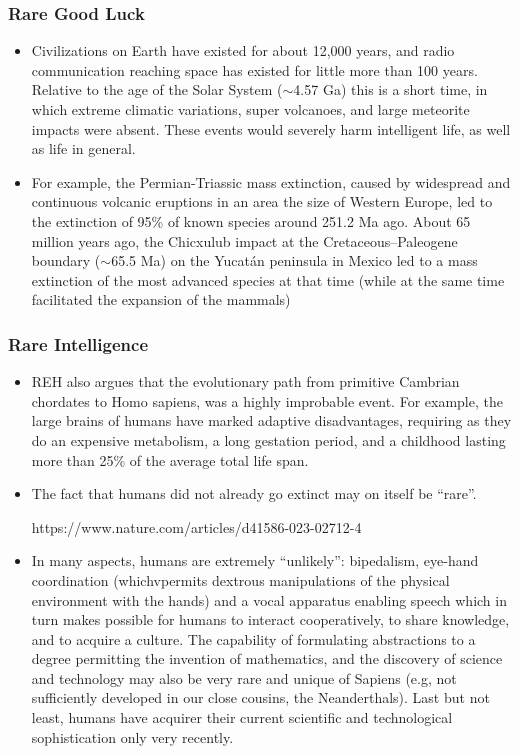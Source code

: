 \begin{frame}
\frametitle{Rare Good Luck}
\begin{itemize}
\item Civilizations on Earth have existed for about 12,000 years, and radio communication reaching space has existed for little more than 100 years. Relative to the age of the Solar System ($\sim$4.57 Ga) this is a short time, in which extreme climatic variations, super volcanoes, and large meteorite impacts were absent. These events would severely harm intelligent life, as well as life in general.
\item For example, the Permian-Triassic mass extinction, caused by widespread and continuous volcanic eruptions in an area the size of Western Europe, led to the extinction of 95\% of known species around 251.2 Ma ago. About 65 million years ago, the Chicxulub impact at the Cretaceous--Paleogene boundary ($\sim$65.5 Ma) on the Yucatán peninsula in Mexico led to a mass extinction of the most advanced species at that time (while at the same time facilitated the expansion of the mammals)
\end{itemize}
\end{frame}


\begin{frame}
\frametitle{Rare Intelligence}
\begin{itemize}
\item REH also argues that the evolutionary path from primitive Cambrian chordates to Homo sapiens, was a highly improbable event. For example, the large brains of humans have marked adaptive disadvantages, requiring as they do an expensive metabolism, a long gestation period, and a childhood lasting more than 25\% of the average total life span.
\item The fact that humans did not already go extinct may on itself be ``rare''.

https://www.nature.com/articles/d41586-023-02712-4

\item In many aspects, humans are extremely ``unlikely'': bipedalism, eye-hand coordination
(whichvpermits dextrous manipulations of the physical environment with the hands) and a vocal apparatus enabling speech which in turn makes possible for humans to interact cooperatively, to share knowledge, and to acquire a culture.
The capability of formulating abstractions to a degree permitting the invention of mathematics, and the discovery of science and technology may also be very rare and unique of Sapiens (e.g, not sufficiently developed in our close cousins, the Neanderthals). Last but not least, humans have acquirer their current scientific and technological sophistication only very recently.
\end{itemize}
\end{frame}

